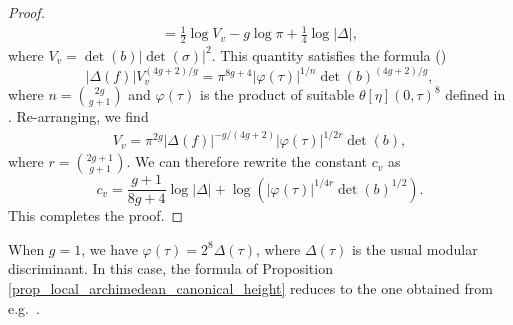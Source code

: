 \documentclass{article} %
\numberwithin{equation}{section}
\begin{document}
\begin{proof}
\begin{multline*}
    = \frac{1}{2} \log V_v - g \log \pi + \frac{1}{4} \log |\Delta|,
    \end{multline*}
    where $V_v = \det(b) |\det(\sigma)|^2$. This quantity satisfies the formula (\cite[Proposition 3.3]{Loc94})
\[ |\Delta(f)| V_v^{(4g+2)/g} = \pi^{8g+4} |\varphi(\tau)|^{1/n} \det(b)^{(4g+2)/g}, \]
where $n = \binom{2g}{g+1}$ and $\varphi(\tau)$ is the product of suitable $\theta[\eta](0, \tau)^8$ defined in \cite[Definition 3.1]{Loc94}. Re-arranging, we find
\begin{align}\label{eq_formula_Vv_theta}
 V_v  = \pi^{2g} |\Delta(f)|^{-g / (4g+2)} |\varphi(\tau)|^{1/2r} \det(b),
 \end{align}
where $r = \binom{2g+1}{g+1}$. We can therefore rewrite the constant $c_v$ as
\[ c_v = \frac{g+1}{8g+4} \log |\Delta| + \log \left( |\varphi(\tau)|^{1/4r} \det(b)^{1/2} \right). \]
This completes the proof. 
\end{proof}
When $g = 1$, we have $\varphi(\tau) = 2^8 \Delta(\tau)$, where $\Delta(\tau)$ is the usual modular discriminant. In this case, the formula of Proposition \ref{prop_local_archimedean_canonical_height} reduces to the one obtained from e.g.\ \cite[Proposition 4.5]{dejong-arakelovtheoryellcurves}. 
\end{document}
